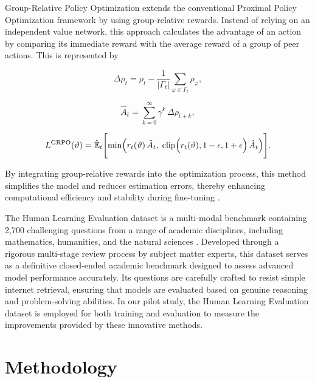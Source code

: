 \documentclass{svproc}
\begin{document}
Group-Relative Policy Optimization extends the conventional Proximal Policy Optimization framework by using group-relative rewards. Instead of relying on an independent value network, this approach calculates the advantage of an action by comparing its immediate reward with the average reward of a group of peer actions. This is represented by

\begin{equation}
  \Delta \rho_t = \rho_t - \frac{1}{|\Gamma_t|} \sum_{\varphi \in \Gamma_t} \rho_\varphi,
\end{equation}

\begin{equation}
  \hat{A}_t = \sum_{k=0}^{\infty} \gamma^k\, \Delta \rho_{t+k},
\end{equation}

\begin{equation}
  L^{\text{GRPO}}(\vartheta) = \hat{\mathbb{E}}_t \Biggl[ \min\Bigl( r_t(\vartheta)\, \hat{A}_t,\; \text{clip}\Bigl(r_t(\vartheta), 1-\epsilon, 1+\epsilon\Bigr)\, \hat{A}_t \Bigr) \Biggr].
\end{equation}

By integrating group-relative rewards into the optimization process, this method simplifies the model and reduces estimation errors, thereby enhancing computational efficiency and stability during fine-tuning \cite{shao2024deepseekmathpushinglimitsmathematical}.

The Human Learning Evaluation dataset is a multi-modal benchmark containing 2,700 challenging questions from a range of academic disciplines, including mathematics, humanities, and the natural sciences \cite{phan2025humanitysexam}. Developed through a rigorous multi-stage review process by subject matter experts, this dataset serves as a definitive closed-ended academic benchmark designed to assess advanced model performance accurately. Its questions are carefully crafted to resist simple internet retrieval, ensuring that models are evaluated based on genuine reasoning and problem-solving abilities. In our pilot study, the Human Learning Evaluation dataset is employed for both training and evaluation to measure the improvements provided by these innovative methods.




\section{Methodology}
\end{document}
